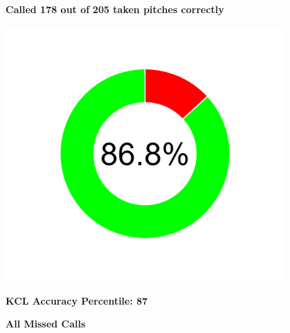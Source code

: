 \documentclass[
]{article}
\begin{document}
\begin{center}
\begin{minipage}[t]{\textwidth}
\begin{minipage}[t]{0.25\textwidth}
\centering
\vspace*{-5em}
\textbf{Called 178 out of}
\textbf{205 taken pitches correctly}
\end{minipage}
\hfill
\begin{minipage}[t]{0.28\textwidth}
\centering
\includegraphics[width=0.8\textwidth]{plots/overall_accuracy.png}
\end{minipage}
\hfill
\begin{minipage}[t]{0.25\textwidth}
\centering
\vspace*{-4em}
\textbf{KCL Accuracy Percentile: 87}
\end{minipage}
\end{minipage}
\end{center}
\begin{center}
\Large \textbf{All Missed Calls}
\end{center}

\vspace{1em}
\end{document}
